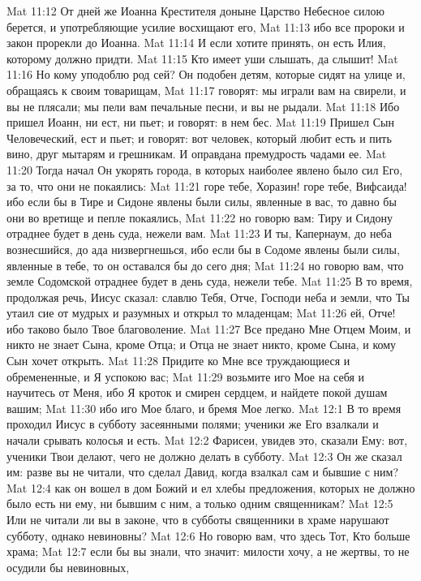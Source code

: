 Mat 11:12  От дней же Иоанна Крестителя доныне Царство Небесное силою берется, и употребляющие усилие восхищают его,
Mat 11:13  ибо все пророки и закон прорекли до Иоанна.
Mat 11:14  И если хотите принять, он есть Илия, которому должно придти.
Mat 11:15  Кто имеет уши слышать, да слышит!
Mat 11:16  Но кому уподоблю род сей? Он подобен детям, которые сидят на улице и, обращаясь к своим товарищам,
Mat 11:17  говорят: мы играли вам на свирели, и вы не плясали; мы пели вам печальные песни, и вы не рыдали.
Mat 11:18  Ибо пришел Иоанн, ни ест, ни пьет; и говорят: в нем бес.
Mat 11:19  Пришел Сын Человеческий, ест и пьет; и говорят: вот человек, который любит есть и пить вино, друг мытарям и грешникам. И оправдана премудрость чадами ее.
Mat 11:20  Тогда начал Он укорять города, в которых наиболее явлено было сил Его, за то, что они не покаялись:
Mat 11:21  горе тебе, Хоразин! горе тебе, Вифсаида! ибо если бы в Тире и Сидоне явлены были силы, явленные в вас, то давно бы они во вретище и пепле покаялись,
Mat 11:22  но говорю вам: Тиру и Сидону отраднее будет в день суда, нежели вам.
Mat 11:23  И ты, Капернаум, до неба вознесшийся, до ада низвергнешься, ибо если бы в Содоме явлены были силы, явленные в тебе, то он оставался бы до сего дня;
Mat 11:24  но говорю вам, что земле Содомской отраднее будет в день суда, нежели тебе.
Mat 11:25  В то время, продолжая речь, Иисус сказал: славлю Тебя, Отче, Господи неба и земли, что Ты утаил сие от мудрых и разумных и открыл то младенцам;
Mat 11:26  ей, Отче! ибо таково было Твое благоволение.
Mat 11:27  Все предано Мне Отцем Моим, и никто не знает Сына, кроме Отца; и Отца не знает никто, кроме Сына, и кому Сын хочет открыть.
Mat 11:28  Придите ко Мне все труждающиеся и обремененные, и Я успокою вас;
Mat 11:29  возьмите иго Мое на себя и научитесь от Меня, ибо Я кроток и смирен сердцем, и найдете покой душам вашим;
Mat 11:30  ибо иго Мое благо, и бремя Мое легко.
Mat 12:1  В то время проходил Иисус в субботу засеянными полями; ученики же Его взалкали и начали срывать колосья и есть.
Mat 12:2  Фарисеи, увидев это, сказали Ему: вот, ученики Твои делают, чего не должно делать в субботу.
Mat 12:3  Он же сказал им: разве вы не читали, что сделал Давид, когда взалкал сам и бывшие с ним?
Mat 12:4  как он вошел в дом Божий и ел хлебы предложения, которых не должно было есть ни ему, ни бывшим с ним, а только одним священникам?
Mat 12:5  Или не читали ли вы в законе, что в субботы священники в храме нарушают субботу, однако невиновны?
Mat 12:6  Но говорю вам, что здесь Тот, Кто больше храма;
Mat 12:7  если бы вы знали, что значит: милости хочу, а не жертвы, то не осудили бы невиновных,
